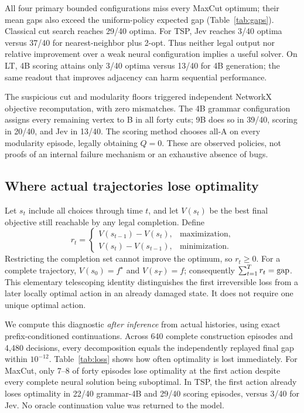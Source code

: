 All four primary bounded configurations miss every MaxCut optimum; their mean gaps also
exceed the uniform-policy expected gap (Table~\ref{tab:gaps}). Classical cut
search reaches 29/40 optima. For TSP, Jev reaches 3/40 optima versus
37/40 for nearest-neighbor plus 2-opt. Thus neither legal output nor relative
improvement over a weak neural configuration implies a useful solver.
On LT, 4B scoring attains only 3/40 optima versus 13/40 for 4B generation;
the same readout that improves adjacency can harm sequential performance.

The suspicious cut and modularity floors triggered independent NetworkX
objective recomputation, with zero mismatches. The 4B grammar configuration
assigns every remaining vertex to B in all forty cuts; 9B does so in 39/40,
scoring in 20/40, and Jev in 13/40. The scoring method chooses all-A on every
modularity episode, legally obtaining $Q=0$. These are observed policies, not
proofs of an internal failure mechanism or an exhaustive absence of bugs.

\subsection{Where actual trajectories lose optimality}
\label{sec:regret}
Let $s_t$ include all choices through time $t$, and let $V(s_t)$ be the best
final objective still reachable by any legal completion. Define
\[
 r_t =
 \begin{cases}
 V(s_{t-1})-V(s_t), & \text{maximization},\\
 V(s_t)-V(s_{t-1}), & \text{minimization}.
 \end{cases}
\]
Restricting the completion set cannot improve the optimum, so $r_t\geq0$.
For a complete trajectory, $V(s_0)=f^\star$ and $V(s_T)=f$; consequently
$\sum_{t=1}^T r_t=\operatorname{gap}$. This elementary telescoping identity distinguishes
the first irreversible loss from a later locally optimal action in an already
damaged state. It does not require one unique optimal action.

We compute this diagnostic \emph{after inference} from actual histories,
using exact prefix-conditioned continuations. Across 640 complete
construction episodes and 4,480 decisions, every decomposition equals the
independently replayed final gap within $10^{-12}$.
Table~\ref{tab:loss} shows how often optimality is lost immediately.
For MaxCut, only 7--8 of forty episodes lose optimality at the first action
despite every complete neural solution being suboptimal. In TSP, the first
action already loses optimality in 22/40 grammar-4B and 29/40 scoring episodes,
versus 3/40 for Jev. No oracle continuation value was returned to the model.


